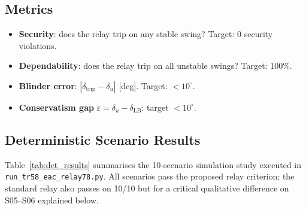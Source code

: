 \documentclass[11pt,a4paper]{article}
\newcommand{\du}{\delta_u}         %
\newcommand{\dlb}{\delta_{\mathrm{LB}}}   %
\begin{document}
\subsection{Metrics}
\begin{itemize}
  \item \textbf{Security}: does the relay trip on any stable swing?
        Target: 0 security violations.
  \item \textbf{Dependability}: does the relay trip on all unstable swings?
        Target: 100\%.
  \item \textbf{Blinder error}: $|\delta_{\mathrm{trip}} - \du|$ [deg].
        Target: $< 10^\circ$.
  \item \textbf{Conservatism gap} $\varepsilon = \du - \dlb$: target $< 10^\circ$.
\end{itemize}

\subsection{Deterministic Scenario Results}
\label{sec:det_results}

Table~\ref{tab:det_results} summarises the 10-scenario simulation study executed
in \texttt{run\_tr58\_eac\_relay78.py}.  All scenarios pass the proposed relay
criterion; the standard relay also passes on 10/10 but for a critical
qualitative difference on S05--S06 explained below.
\end{document}
